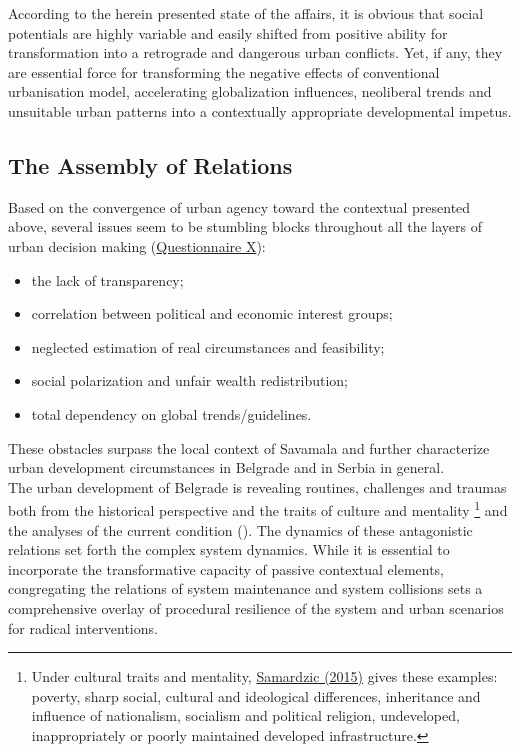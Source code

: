 \documentclass[11pt]{report}
\begin{document}
According to the herein presented state of the affairs, it is obvious that social potentials are highly variable and easily shifted from positive ability for transformation into a retrograde and dangerous urban conflicts. 
Yet, if any, they are essential force for transforming the negative effects of conventional urbanisation model, accelerating globalization influences, neoliberal trends and unsuitable urban patterns into a contextually appropriate developmental impetus. 

\subsection{The Assembly of Relations}

Based on the convergence of urban agency toward  the contextual presented above, several issues seem to be stumbling blocks throughout all the layers of urban decision making
(\href{Questionnaire Experts Post-socialist}{Questionnaire X}):

\begin{itemize}
\item the lack of transparency;
\item correlation between political and economic interest groups;
\item neglected estimation of real circumstances and feasibility;
\item social polarization and unfair wealth redistribution;
\item total dependency on global trends/guidelines.
\end{itemize}

These obstacles surpass the local context of Savamala and further characterize urban development circumstances in Belgrade and in Serbia in general.
\\

The  urban  development  of  Belgrade  is  revealing  routines, challenges  and  traumas both from the historical perspective and the traits of culture and mentality
\footnote{Under cultural traits and mentality, \href{Samardzic}{Samardzic (2015)} gives these examples: poverty, sharp social, cultural and ideological differences, inheritance and influence of nationalism, socialism and political religion, undeveloped, inappropriately or poorly maintained developed infrastructure.}
and the analyses of the current condition (\cite{Samardzic2015}). 
The dynamics of these antagonistic relations set forth the complex system dynamics.
While it is essential to incorporate the transformative capacity of passive contextual elements, congregating the relations of system maintenance and system collisions sets a comprehensive overlay of procedural resilience of the system and urban scenarios for radical interventions.
\\
\end{document}
